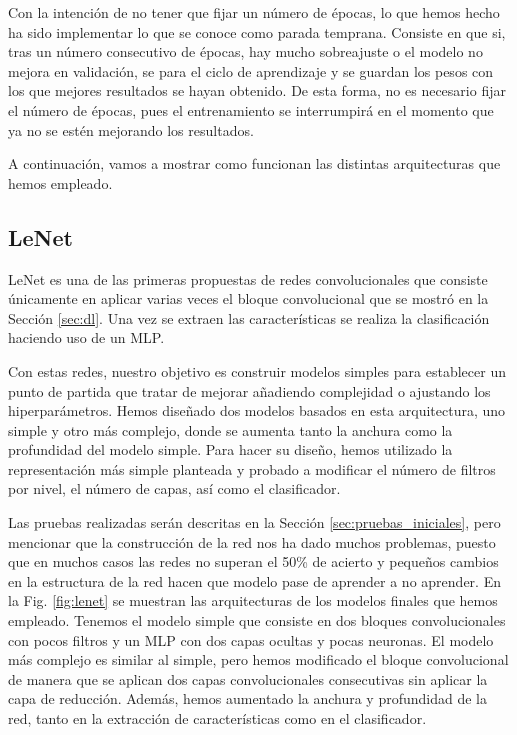 \documentclass[a4paper,12pt,oneside,titlepage]{book}
\newcommand{\red}[1]{\textcolor{red}{#1}}
\begin{document}
Con la intención de no tener que fijar un número de épocas, lo que hemos hecho ha sido implementar lo que se conoce como parada temprana. Consiste en que si, tras un número consecutivo de épocas, hay mucho sobreajuste o el modelo no mejora en validación, se para el ciclo de aprendizaje y se guardan los pesos con los que mejores resultados se hayan obtenido. De esta forma, no es necesario fijar el número de épocas, pues el entrenamiento se interrumpirá en el momento que ya no se estén mejorando los resultados. %
 
A continuación, vamos a mostrar como funcionan las distintas arquitecturas que hemos empleado.

\subsection*{LeNet}
\label{sec:lenet}
LeNet es una de las primeras propuestas de redes convolucionales \cite{lenet} que consiste únicamente en aplicar varias veces el bloque convolucional que se mostró en la Sección \ref{sec:dl}. Una vez se extraen las características se realiza la clasificación haciendo uso de un MLP. 

Con estas redes, nuestro objetivo es construir modelos simples para establecer un punto de partida que tratar de mejorar añadiendo complejidad o ajustando los hiperparámetros. Hemos diseñado dos modelos basados en esta arquitectura, uno simple y otro más complejo, donde se aumenta tanto la anchura como la profundidad del modelo simple. Para hacer su diseño, hemos utilizado la representación más simple planteada y probado a modificar el número de filtros por nivel, el número de capas, así como el clasificador.

Las pruebas realizadas serán descritas en la Sección \ref{sec:pruebas_iniciales}, pero mencionar que la construcción de la red nos ha dado muchos problemas, puesto que en muchos casos las redes no superan el 50\% de acierto y pequeños cambios en la estructura de la red hacen que modelo pase de aprender a no aprender. En la Fig. \ref{fig:lenet} se muestran las arquitecturas de los modelos finales que hemos empleado. Tenemos el modelo simple que consiste en dos bloques convolucionales con pocos filtros y un MLP con dos capas ocultas y pocas neuronas. El modelo más complejo es similar al simple, pero hemos modificado el bloque convolucional de manera que se aplican dos capas convolucionales consecutivas sin aplicar la capa de reducción. Además, hemos aumentado la anchura y profundidad de la red, tanto en la extracción de características como en el clasificador.
\end{document}

